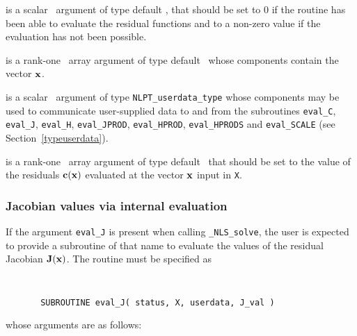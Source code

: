 \documentclass{galahad}
\newcommand{\packagename}{NLS}
\newcommand{\fullpackagename}{\libraryname\_\packagename}
\newcommand{\solver}{{\tt \fullpackagename\_solve}}
\begin{document}
\begin{description}
 is a scalar \intentout\ argument of type default \integer,
that should be set to 0 if the routine has been able to evaluate
the residual functions
and to a non-zero value if the evaluation has not been possible.

 is a rank-one \intentin\ array argument of type default \realdp\
whose components contain the vector ${\mathbf{x}}$.

 is a scalar \intentinout\ argument of type
{\tt NLPT\_userdata\_type} whose components may be used
to communicate user-supplied data to and from the subroutines
{\tt eval\_C}, {\tt eval\_J}, {\tt eval\_H}, {\tt eval\_JPROD},
{\tt eval\_HPROD}, {\tt eval\_HPRODS} and {\tt eval\_SCALE}
(see Section~\ref{typeuserdata}).

 is a rank-one \intentout\ array argument of type default \realdp\
that should be set to the value of the residuals ${\mathbf{c}}({\mathbf{x}})$
evaluated at the vector ${\mathbf{x}}$ input in {\tt X}.

\end{description}


\subsubsection{Jacobian values via internal evaluation\label{jfv}}

If the argument {\tt eval\_J} is present when calling \solver, the
user is expected to provide a subroutine of that name to evaluate the
values of the residual Jacobian ${\mathbf{J}}({\mathbf{x}})$.
The routine must be specified as

\def\baselinestretch{0.8}
{\tt
\begin{verbatim}
       SUBROUTINE eval_J( status, X, userdata, J_val )
\end{verbatim} }
\def\baselinestretch{1.0}
\noindent whose arguments are as follows:
\end{document}
